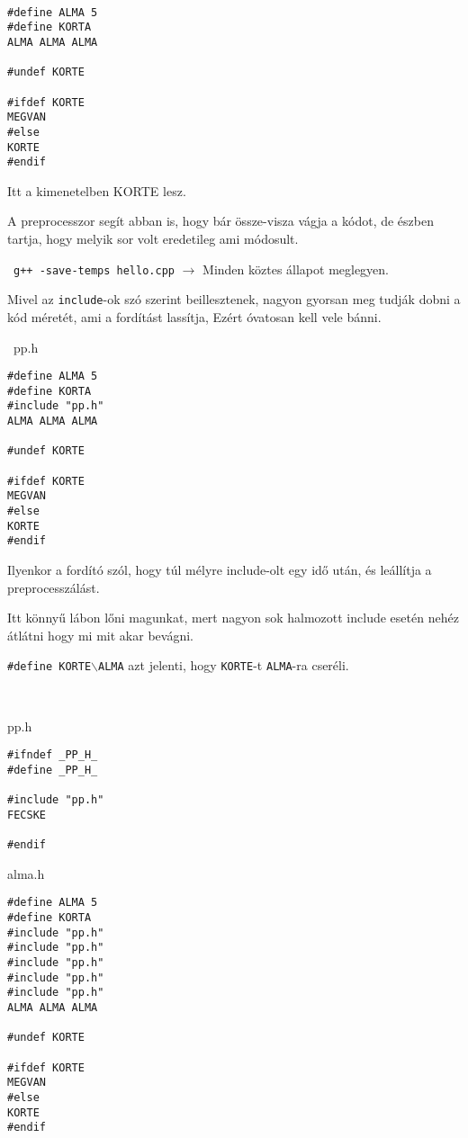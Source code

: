\documentclass[a4paper,11.5pt]{article}
\begin{document}
	\begin{example}\
		
		\begin{lstlisting}
#define ALMA 5
#define KORTA
ALMA ALMA ALMA

#undef KORTE

#ifdef KORTE
MEGVAN
#else
KORTE
#endif
		\end{lstlisting}
		Itt a kimenetelben KORTE lesz.
	\end{example}
	A preprocesszor segít abban is, hogy bár össze-visza vágja a kódot, de észben tartja, hogy melyik sor volt eredetileg ami módosult.
	\begin{note}\
		\texttt{g++ -save-temps hello.cpp} $\rightarrow$ Minden köztes állapot meglegyen.
	\end{note}
	Mivel az \texttt{include}-ok szó szerint beillesztenek, nagyon gyorsan meg tudják dobni a kód méretét, ami a fordítást lassítja, Ezért óvatosan kell vele bánni.
	\begin{example}\ 
		pp.h
		\begin{lstlisting}
#define ALMA 5
#define KORTA
#include "pp.h"
ALMA ALMA ALMA

#undef KORTE

#ifdef KORTE
MEGVAN
#else
KORTE
#endif
		\end{lstlisting}
	\end{example}
		
	Ilyenkor a fordító szól, hogy túl mélyre include-olt egy idő után, és leállítja a preprocesszálást.
	
	Itt könnyű lábon lőni magunkat, mert nagyon sok halmozott include esetén nehéz átlátni hogy mi mit akar bevágni.
	\begin{note}
		\texttt{\#define KORTE$\backslash$ALMA} azt jelenti, hogy \texttt{KORTE}-t \texttt{ALMA}-ra cseréli.
	\end{note}
	\begin{example}\ 
		
		pp.h
		\begin{lstlisting}
#ifndef _PP_H_
#define _PP_H_

#include "pp.h"
FECSKE

#endif
		\end{lstlisting}
		
		alma.h
		\begin{lstlisting}
#define ALMA 5
#define KORTA
#include "pp.h"
#include "pp.h"
#include "pp.h"
#include "pp.h"
#include "pp.h"
ALMA ALMA ALMA

#undef KORTE

#ifdef KORTE
MEGVAN
#else
KORTE
#endif
		\end{lstlisting}
	\end{example}
	
\end{document}
